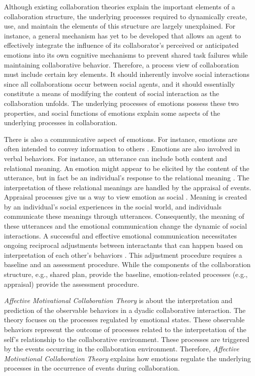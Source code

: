 \documentclass[12pt]{report}
\begin{document}
Although existing collaboration theories explain the important elements of a
collaboration structure, the underlying processes required to dynamically
create, use, and maintain the elements of this structure are largely
unexplained. For instance, a general mechanism has yet to be developed that
allows an agent to effectively integrate the influence of its collaborator's
perceived or anticipated emotions into its own cognitive mechanisms to prevent
shared task failures while maintaining collaborative behavior. Therefore, a
process view of collaboration must include certain key elements. It should
inherently involve social interactions since all collaborations occur between
social agents, and it should essentially constitute a means of modifying the
content of social interaction as the collaboration unfolds. The underlying
processes of emotions possess these two properties, and social functions of
emotions explain some aspects of the underlying processes in collaboration.

There is also a communicative aspect of emotions. For instance, emotions are
often intended to convey information to others \cite{goffman:self-presentation}.
Emotions are also involved in verbal behaviors. For instance, an utterance can
include both content and relational meaning. An emotion might appear to be
elicited by the content of the utterance, but in fact be an individual's
response to the relational meaning \cite{planalp:communicating-emotion}. The
interpretation of these relational meanings are handled by the appraisal of
events. Appraisal processes give us a way to view emotion as social
\cite{hooft:sharing-emotions}. Meaning is created by an individual's social
experiences in the social world, and individuals communicate these meanings
through utterances. Consequently, the meaning of these utterances and the
emotional communication change the dynamic of social interactions. A successful
and effective emotional communication necessitates ongoing reciprocal
adjustments between interactants that can happen based on interpretation of each
other's behaviors \cite{parkinson:emotion-social-interaction}. This adjustment
procedure requires a baseline and an assessment procedure. While the components
of the collaboration structure, e.g., shared plan, provide the baseline,
emotion-related processes (e.g., appraisal) provide the assessment procedure.

\textit{Affective Motivational Collaboration Theory} is about the interpretation
and prediction of the observable behaviors in a dyadic collaborative
interaction. The theory focuses on the processes regulated by emotional states.
These observable behaviors represent the outcome of processes related to the
interpretation of the self's relationship to the collaborative environment.
These processes are triggered by the events occurring in the collaboration
environment. Therefore, \textit{Affective Motivational Collaboration Theory}
explains how emotions regulate the underlying processes in the occurrence of
events during collaboration.
\end{document}
